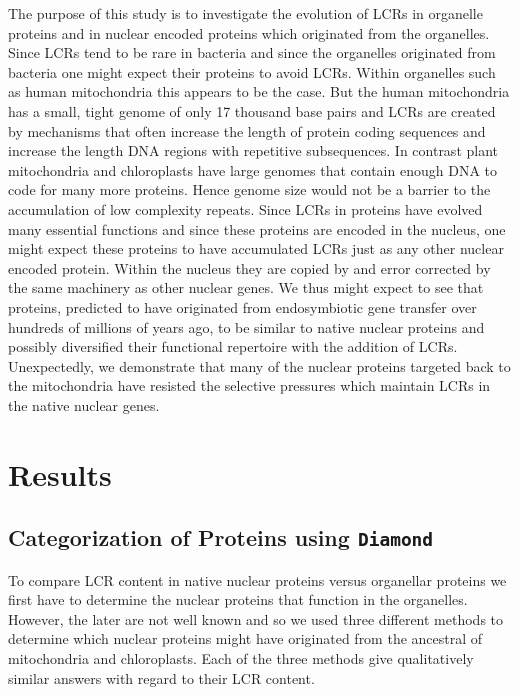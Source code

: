 \documentclass[a4paper,12pt]{article}
\renewcommand{\diamond}{\mbox{\texttt{Diamond}}\xspace}
\begin{document}
\begin{multicols}{2}
The purpose of this study is to investigate the evolution of LCRs in
organelle proteins and in nuclear encoded proteins which originated from
the organelles.  Since LCRs tend to be rare in bacteria and since the
organelles originated from bacteria one might expect their proteins to
avoid LCRs.  Within organelles such as human mitochondria this appears
to be the case.  But the human mitochondria has a small, tight genome
of only 17 thousand base pairs and LCRs are created by mechanisms that
often increase the length of protein coding sequences and increase the
length DNA regions with repetitive subsequences.  In contrast plant
mitochondria and chloroplasts have large genomes that contain enough
DNA to code for many more proteins. Hence genome size would not be a
barrier to the accumulation of low complexity repeats.  Since LCRs in
proteins have evolved many essential functions and since these proteins
are encoded in the nucleus, one might expect these proteins to have
accumulated LCRs just as any other nuclear encoded protein. Within the
nucleus they are copied by and error corrected by the same machinery
as other nuclear genes. We thus might expect to see that proteins,
predicted to have originated from endosymbiotic gene transfer over
hundreds of millions of years ago, to be similar to native nuclear
proteins and possibly diversified their functional repertoire with the
addition of LCRs. Unexpectedly, we demonstrate that many of the nuclear
proteins targeted back to the mitochondria have resisted the selective
pressures which maintain LCRs in the native nuclear genes.



\section*{Results}

\subsection*{Categorization of Proteins using \diamond}

To compare LCR content in native nuclear proteins versus organellar
proteins we first have to determine the nuclear proteins that
function in the organelles.  However, the later are not well known
and so we used three different methods to determine which nuclear proteins
might have originated from the ancestral of mitochondria and
chloroplasts.  Each of the three methods give qualitatively similar
answers with regard to their LCR content.


\end{multicols}
\end{document}
